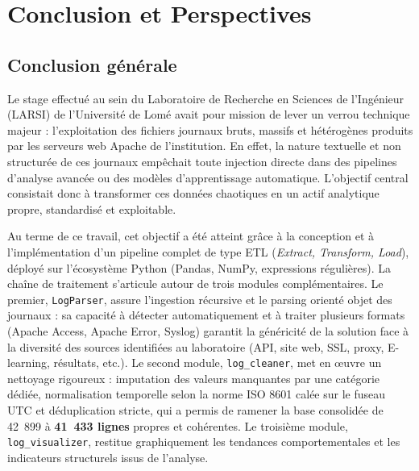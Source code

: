 \documentclass[a4paper,12pt]{article}
\begin{document}
\chapter*{Conclusion et Perspectives}

\section*{Conclusion générale}

Le stage effectué au sein du Laboratoire de Recherche en Sciences de l'Ingénieur (LARSI) de l'Université de Lomé avait pour mission de lever un verrou technique majeur : l'exploitation des fichiers journaux bruts, massifs et hétérogènes produits par les serveurs web Apache de l'institution. En effet, la nature textuelle et non structurée de ces journaux empêchait toute injection directe dans des pipelines d'analyse avancée ou des modèles d'apprentissage automatique. L'objectif central consistait donc à transformer ces données chaotiques en un actif analytique propre, standardisé et exploitable.

Au terme de ce travail, cet objectif a été atteint grâce à la conception et à l'implémentation d'un pipeline complet de type ETL (\emph{Extract, Transform, Load}), déployé sur l'écosystème Python (Pandas, NumPy, expressions régulières). La chaîne de traitement s'articule autour de trois modules complémentaires. Le premier, \texttt{LogParser}, assure l'ingestion récursive et le parsing orienté objet des journaux : sa capacité à détecter automatiquement et à traiter plusieurs formats (Apache Access, Apache Error, Syslog) garantit la généricité de la solution face à la diversité des sources identifiées au laboratoire (API, site web, SSL, proxy, E-learning, résultats, etc.). Le second module, \texttt{log\_cleaner}, met en œuvre un nettoyage rigoureux : imputation des valeurs manquantes par une catégorie dédiée, normalisation temporelle selon la norme ISO 8601 calée sur le fuseau UTC et déduplication stricte, qui a permis de ramener la base consolidée de 42~899 à \textbf{41~433 lignes} propres et cohérentes. Le troisième module, \texttt{log\_visualizer}, restitue graphiquement les tendances comportementales et les indicateurs structurels issus de l'analyse.
\end{document}
